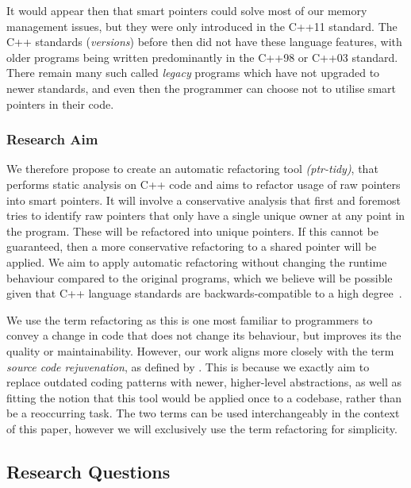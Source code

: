 \documentclass{proposal}
\begin{document}
    It would appear then that smart pointers could solve most of our memory management issues, but they were only introduced in the C++11 standard.
    The C++ standards (\textit{versions}) before then did not have these language features, with older programs being written predominantly in the C++98 or C++03 standard.
    There remain many such called \emph{legacy} programs which have not upgraded to newer standards, and even then the programmer can choose not to utilise smart pointers in their code.

    \subsubsection{Research Aim}\label{subsubsec:reseach-aim}


    We therefore propose to create an automatic refactoring tool \emph{(ptr-tidy)}, that performs static analysis on C++ code and aims to refactor usage of raw pointers into smart pointers.
    It will involve a conservative analysis that first and foremost tries to identify raw pointers that only have a single unique owner at any point in the program.
    These will be refactored into unique pointers.
    If this cannot be guaranteed, then a more conservative refactoring to a shared pointer will be applied.
    We aim to apply automatic refactoring without changing the runtime behaviour compared to the original programs, which we believe will be possible given that C++ language standards are backwards-compatible to a high degree~\cite{Winters2020}.

    We use the term refactoring as this is one most familiar to programmers to convey a change in code that does not change its behaviour, but improves its the quality or maintainability.
    However, our work aligns more closely with the term \emph{source code rejuvenation}, as defined by \citet{Pirkelbauer2010}.
    This is because we exactly aim to replace outdated coding patterns with newer, higher-level abstractions, as well as fitting the notion that this tool would be applied once to a codebase, rather than be a reoccurring task.
    The two terms can be used interchangeably in the context of this paper, however we will exclusively use the term refactoring for simplicity.

    \subsection{Research Questions}\label{subsec:research-questions}
\end{document}

